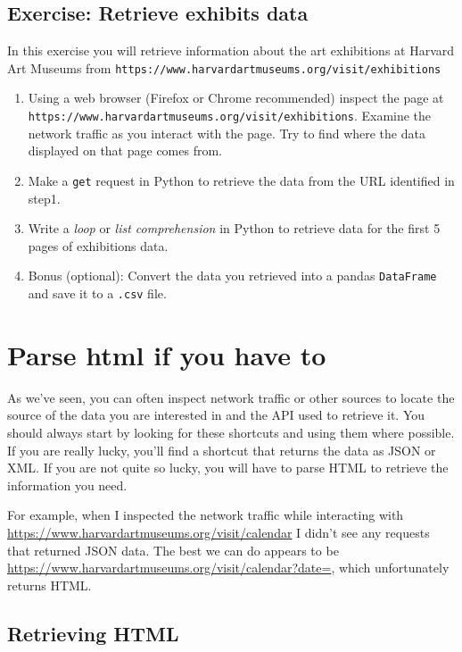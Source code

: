 \documentclass[]{book}
\providecommand{\tightlist}{%
  \setlength{\itemsep}{0pt}\setlength{\parskip}{0pt}}
\begin{document}
\subsection{Exercise: Retrieve exhibits
data}\label{exercise-retrieve-exhibits-data}

In this exercise you will retrieve information about the art exhibitions
at Harvard Art Museums from
\texttt{https://www.harvardartmuseums.org/visit/exhibitions}

\begin{enumerate}
\def\labelenumi{\arabic{enumi}.}
\tightlist
\item
  Using a web browser (Firefox or Chrome recommended) inspect the page
  at \texttt{https://www.harvardartmuseums.org/visit/exhibitions}.
  Examine the network traffic as you interact with the page. Try to find
  where the data displayed on that page comes from.
\item
  Make a \texttt{get} request in Python to retrieve the data from the
  URL identified in step1.
\item
  Write a \emph{loop} or \emph{list comprehension} in Python to retrieve
  data for the first 5 pages of exhibitions data.
\item
  Bonus (optional): Convert the data you retrieved into a pandas
  \texttt{DataFrame} and save it to a \texttt{.csv} file.
\end{enumerate}

\section{Parse html if you have to}\label{parse-html-if-you-have-to}

As we've seen, you can often inspect network traffic or other sources to
locate the source of the data you are interested in and the API used to
retrieve it. You should always start by looking for these shortcuts and
using them where possible. If you are really lucky, you'll find a
shortcut that returns the data as JSON or XML. If you are not quite so
lucky, you will have to parse HTML to retrieve the information you need.

For example, when I inspected the network traffic while interacting with
\url{https://www.harvardartmuseums.org/visit/calendar} I didn't see any
requests that returned JSON data. The best we can do appears to be
\url{https://www.harvardartmuseums.org/visit/calendar?date=}, which
unfortunately returns HTML.

\subsection{Retrieving HTML}\label{retrieving-html}
\end{document}
